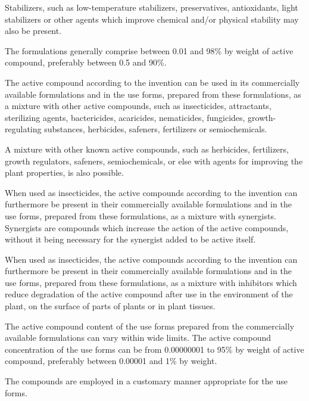 \documentclass[11pt,a4paper]{article}
\begin{document}
Stabilizers, such as low-temperature stabilizers, preservatives, antioxidants, light stabilizers or other agents which improve chemical and/or physical stability may also be present.

The formulations generally comprise between 0.01 and 98\% by weight of active compound, preferably between 0.5 and 90\%.

The active compound according to the invention can be used in its commercially available formulations and in the use forms, prepared from these formulations, as a mixture with other active compounds, such as insecticides, attractants, sterilizing agents, bactericides, acaricides, nematicides, fungicides, growth-regulating substances, herbicides, safeners, fertilizers or semiochemicals.

A mixture with other known active compounds, such as herbicides, fertilizers, growth regulators, safeners, semiochemicals, or else with agents for improving the plant properties, is also possible.

When used as insecticides, the active compounds according to the invention can furthermore be present in their commercially available formulations and in the use forms, prepared from these formulations, as a mixture with synergists. Synergists are compounds which increase the action of the active compounds, without it being necessary for the synergist added to be active itself.

When used as insecticides, the active compounds according to the invention can furthermore be present in their commercially available formulations and in the use forms, prepared from these formulations, as a mixture with inhibitors which reduce degradation of the active compound after use in the environment of the plant, on the surface of parts of plants or in plant tissues.

The active compound content of the use forms prepared from the commercially available formulations can vary within wide limits. The active compound concentration of the use forms can be from 0.00000001 to 95\% by weight of active compound, preferably between 0.00001 and 1\% by weight.

The compounds are employed in a customary manner appropriate for the use forms.
\end{document}
